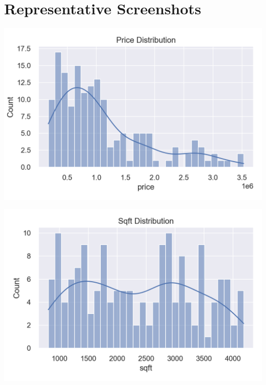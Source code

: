 \documentclass[11pt]{article}
\begin{document}
\section*{Representative Screenshots}
\vspace{-0.6em}
\begin{center}

\begin{minipage}[t]{0.48\linewidth}
  \centering
  \includegraphics[width=\linewidth]{fig_price_dist.png}
\end{minipage}\hfill
\begin{minipage}[t]{0.48\linewidth}
  \centering
  \includegraphics[width=\linewidth]{fig_sqft_dist.png}
\end{minipage}

\vspace{0.6em}


\end{center}
\end{document}
